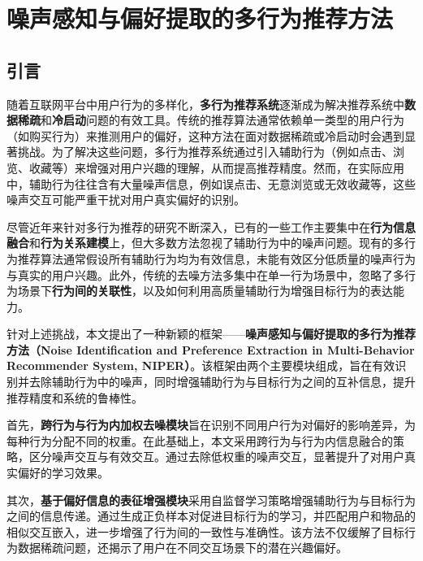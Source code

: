 
\chapter{噪声感知与偏好提取的多行为推荐方法}

\section{引言}
随着互联网平台中用户行为的多样化，\textbf{多行为推荐系统}逐渐成为解决推荐系统中\textbf{数据稀疏}和\textbf{冷启动}问题的有效工具。传统的推荐算法通常依赖单一类型的用户行为（如购买行为）来推测用户的偏好，这种方法在面对数据稀疏或冷启动时会遇到显著挑战。为了解决这些问题，多行为推荐系统通过引入辅助行为（例如点击、浏览、收藏等）来增强对用户兴趣的理解，从而提高推荐精度。然而，在实际应用中，辅助行为往往含有大量噪声信息，例如误点击、无意浏览或无效收藏等，这些噪声交互可能严重干扰对用户真实偏好的识别。

尽管近年来针对多行为推荐的研究不断深入，已有的一些工作主要集中在\textbf{行为信息融合}和\textbf{行为关系建模}上，但大多数方法忽视了辅助行为中的噪声问题。现有的多行为推荐算法通常假设所有辅助行为均为有效信息，未能有效区分低质量的噪声行为与真实的用户兴趣。此外，传统的去噪方法多集中在单一行为场景中，忽略了多行为场景下\textbf{行为间的关联性}，以及如何利用高质量辅助行为增强目标行为的表达能力。

针对上述挑战，本文提出了一种新颖的框架——\textbf{噪声感知与偏好提取的多行为推荐方法（Noise Identification and Preference Extraction in Multi-Behavior Recommender System, NIPER）}。该框架由两个主要模块组成，旨在有效识别并去除辅助行为中的噪声，同时增强辅助行为与目标行为之间的互补信息，提升推荐精度和系统的鲁棒性。

首先，\textbf{跨行为与行为内加权去噪模块}旨在识别不同用户行为对偏好的影响差异，为每种行为分配不同的权重。在此基础上，本文采用跨行为与行为内信息融合的策略，区分噪声交互与有效交互。通过去除低权重的噪声交互，显著提升了对用户真实偏好的学习效果。

其次，\textbf{基于偏好信息的表征增强模块}采用自监督学习策略增强辅助行为与目标行为之间的信息传递。通过生成正负样本对促进目标行为的学习，并匹配用户和物品的相似交互嵌入，进一步增强了行为间的一致性与准确性。该方法不仅缓解了目标行为数据稀疏问题，还揭示了用户在不同交互场景下的潜在兴趣偏好。

